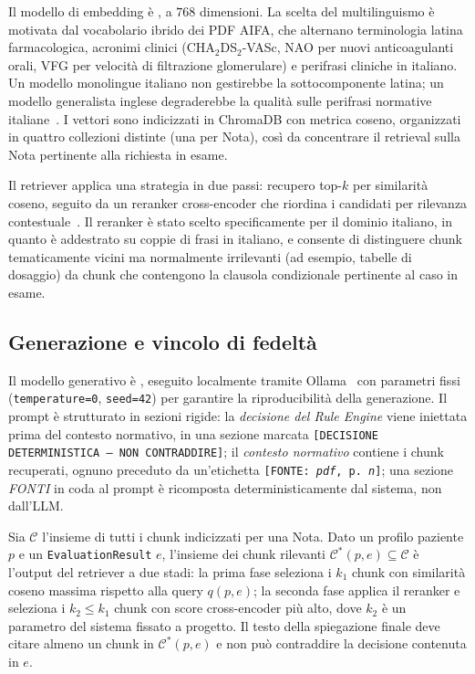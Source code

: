 Il modello di embedding è \embedmodel, a $768$ dimensioni.
La scelta del multilinguismo è motivata dal vocabolario ibrido dei PDF AIFA,
che alternano terminologia latina farmacologica, acronimi clinici
(CHA$_2$DS$_2$-VASc, NAO per nuovi anticoagulanti orali, VFG per velocità di filtrazione glomerulare) e perifrasi cliniche in italiano.
Un modello monolingue italiano non gestirebbe la sottocomponente latina;
un modello generalista inglese degraderebbe la qualità sulle perifrasi
normative italiane~\cite{reimers2019sbert}.
I vettori sono indicizzati in ChromaDB con metrica coseno, organizzati
in quattro collezioni distinte (una per Nota), così da concentrare il
retrieval sulla Nota pertinente alla richiesta in esame.

Il retriever applica una strategia in due passi: recupero top-$k$ per
similarità coseno, seguito da un reranker cross-encoder \reranker{}
che riordina i candidati per rilevanza contestuale~\cite{nogueira2019passage}.
Il reranker è stato scelto specificamente per il dominio italiano, in quanto
è addestrato su coppie di frasi in italiano, e consente di distinguere
chunk tematicamente vicini ma normalmente irrilevanti (ad esempio,
tabelle di dosaggio) da chunk che contengono la clausola condizionale
pertinente al caso in esame.

\subsection{Generazione e vincolo di fedeltà}
\label{subsec:generazione}

Il modello generativo è \llmmodel, eseguito localmente tramite
Ollama~\cite{ollama2024} con parametri fissi (\texttt{temperature=0},
\texttt{seed=42}) per garantire la riproducibilità della generazione.
Il prompt è strutturato in sezioni rigide: la \emph{decisione del Rule Engine}
viene iniettata prima del contesto normativo, in una sezione marcata
\texttt{[DECISIONE DETERMINISTICA --- NON CONTRADDIRE]};
il \emph{contesto normativo} contiene i chunk recuperati, ognuno preceduto
da un'etichetta \texttt{[FONTE: \textit{pdf}, p.\,\textit{n}]};
una sezione \emph{FONTI} in coda al prompt è ricomposta deterministicamente
dal sistema, non dall'LLM.

\begin{definition}
\label{def:chunk-rilevanti}
Sia $\mathcal{C}$ l'insieme di tutti i chunk indicizzati per una Nota.
Dato un profilo paziente $p$ e un \texttt{EvaluationResult} $e$,
l'insieme dei chunk rilevanti $\mathcal{C}^*(p, e) \subseteq \mathcal{C}$
è l'output del retriever a due stadi: la prima fase seleziona i $k_1$
chunk con similarità coseno massima rispetto alla query $q(p, e)$;
la seconda fase applica il reranker \reranker{} e seleziona i $k_2 \leq k_1$
chunk con score cross-encoder più alto, dove $k_2$ è un parametro
del sistema fissato a progetto.
Il testo della spiegazione finale deve citare almeno un chunk in
$\mathcal{C}^*(p, e)$ e non può contraddire la decisione contenuta in $e$.
\end{definition}

